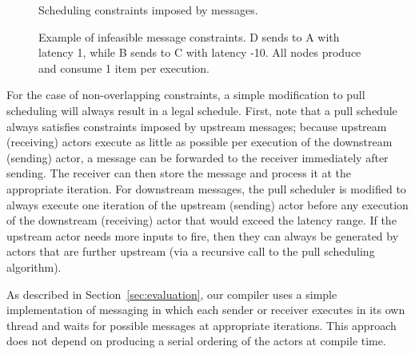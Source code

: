 \begin{figure}[t]
\begin{center}
\caption{\small Scheduling constraints imposed by messages.}
\label{tab:messcons}
\end{center}
\end{figure}

\begin{figure}[t]
\begin{center}
\caption{{\small Example of infeasible message constraints.  D sends
to A with latency 1, while B sends to C with latency -10.  All nodes
produce and consume 1 item per execution.}
\protect\label{fig:infeasible}}
\end{center}
\vspace{-12pt}
\end{figure}

For the case of non-overlapping constraints, a simple modification to
pull scheduling will always result in a legal schedule.  First, note
that a pull schedule always satisfies constraints imposed by upstream
messages; because upstream (receiving) actors execute as little as
possible per execution of the downstream (sending) actor, a message
can be forwarded to the receiver immediately after sending.  The
receiver can then store the message and process it at the appropriate
iteration.  For downstream messages, the pull scheduler is modified to
always execute one iteration of the upstream (sending) actor before
any execution of the downstream (receiving) actor that would exceed
the latency range.  If the upstream actor needs more inputs to fire,
then they can always be generated by actors that are further upstream
(via a recursive call to the pull scheduling algorithm).

As described in Section~\ref{sec:evaluation}, our compiler uses a
simple implementation of messaging in which each sender or receiver
executes in its own thread and waits for possible messages at
appropriate iterations.  This approach does not depend on producing a
serial ordering of the actors at compile time.


